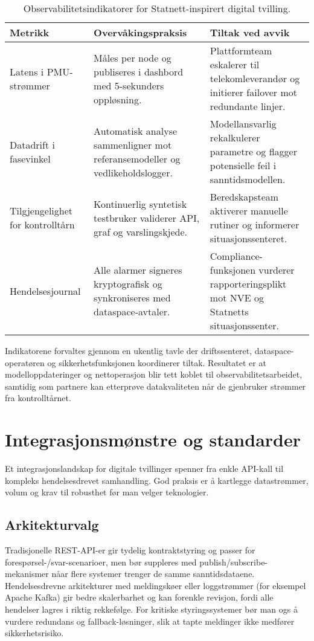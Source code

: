 \begin{table}[ht]
    \centering
    \caption{Observabilitetsindikatorer for Statnett-inspirert digital tvilling.}
    \label{tab:kap03-observabilitet-kraft}
    \begin{tabular}{p{}p{}p{}}
        \toprule
        \textbf{Metrikk} & \textbf{Overvåkingspraksis} & \textbf{Tiltak ved avvik} \\
        \midrule
        Latens i PMU-strømmer & Måles per node og publiseres i dashbord med 5-sekunders oppløsning. & Plattformteam eskalerer til telekomleverandør og initierer failover mot redundante linjer. \\
        Datadrift i fasevinkel & Automatisk analyse sammenligner mot referansemodeller og vedlikeholdslogger. & Modellansvarlig rekalkulerer parametre og flagger potensielle feil i sanntidsmodellen. \\
        Tilgjengelighet for kontrolltårn & Kontinuerlig syntetisk testbruker validerer API, graf og varslingskjede. & Beredskapsteam aktiverer manuelle rutiner og informerer situasjonssenteret. \\
        Hendelsesjournal & Alle alarmer signeres kryptografisk og synkroniseres med dataspace-avtaler. & Compliance-funksjonen vurderer rapporteringsplikt mot NVE og Statnetts situasjonssenter. \\
        \bottomrule
    \end{tabular}
\end{table}

Indikatorene forvaltes gjennom en ukentlig tavle der driftssenteret, dataspace-operatøren og sikkerhetsfunksjonen koordinerer tiltak. Resultatet er at modelloppdateringer og nettoperasjon blir tett koblet til observabilitetsarbeidet, samtidig som partnere kan etterprøve datakvaliteten når de gjenbruker strømmer fra kontrolltårnet.

\section{Integrasjonsmønstre og standarder}
Et integrasjonslandskap for digitale tvillinger spenner fra enkle API-kall til kompleks hendelsesdrevet samhandling. God praksis er  å kartlegge datastrømmer, volum og krav til robusthet før man velger teknologier.

\subsection{Arkitekturvalg}
Tradisjonelle REST-API-er gir tydelig kontraktstyring og passer for forespørsel-/svar-scenarioer, men bør suppleres med publish/subscribe-mekanismer nåar flere systemer trenger de samme sanntidsdataene. Hendelsesdrevne arkitekturer med meldingskøer eller loggstrømmer (for eksempel Apache Kafka) gir bedre skalerbarhet og kan forenkle revisjon, fordi alle hendelser lagres i riktig rekkefølge. For kritiske styringssystemer bør man ogs å vurdere redundans og fallback-løsninger, slik at tapte meldinger ikke medfører sikkerhetsrisiko.

